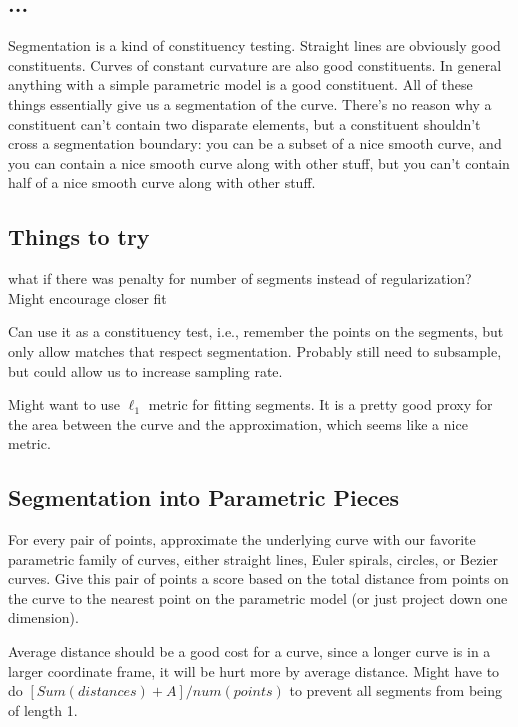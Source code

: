 \documentclass{article}
\begin{document}
\subsection{...}

Segmentation is a kind of constituency testing.  Straight lines are
obviously good constituents. Curves of constant curvature are also
good constituents. In general anything with a simple parametric model
is a good constituent. All of these things essentially give us a
segmentation of the curve. There's no reason why a constituent can't
contain two disparate elements, but a constituent shouldn't cross a
segmentation boundary: you can be a subset of a nice smooth curve, and
you can contain a nice smooth curve along with other stuff, but you
can't contain half of a nice smooth curve along with other stuff.


\subsection{Things to try}
\bitem
\item what if there was penalty for number of segments instead of
  regularization? Might encourage closer fit
\item Can use it as a constituency test, i.e., remember the points on
  the segments, but only allow matches that respect
  segmentation. Probably still need to subsample, but could allow us
  to increase sampling rate.
\item Might want to use $\ell_1$ metric for fitting segments. It is a
  pretty good proxy for the area between the curve and the
  approximation, which seems like a nice metric.

\eitem

\subsection{Segmentation into Parametric Pieces}
  For every pair of points, approximate the underlying curve with our
  favorite parametric family of curves, either straight lines, Euler
  spirals, circles, or Bezier curves. Give this pair of points a score
  based on the total distance from points on the curve to the nearest
  point on the parametric model (or just project down one dimension).

  Average distance should be a good cost for a curve, since a longer
  curve is in a larger coordinate frame, it will be hurt more by
  average distance.  Might have to do $[Sum(distances) + A] /
  num(points)$ to prevent all segments from being of length 1.
\end{document}
